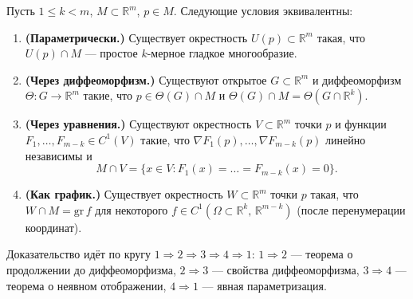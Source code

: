 \begin{theorem}
  \label{theorem:manifold}
  Пусть $1 \leq k < m$, $M \subset \mathbb{R}^m$, $p \in M$.
  Следующие условия эквивалентны:

  \begin{enumerate}
    \item \textbf{(Параметрически.)}
          Существует окрестность $U(p) \subset \mathbb{R}^m$ такая, что
          $U(p) \cap M$ --- простое $k$-мерное гладкое многообразие.

    \item \textbf{(Через диффеоморфизм.)}
          Существуют открытое $G \subset \mathbb{R}^m$ и диффеоморфизм
          $\Theta: G \to \mathbb{R}^m$ такие, что $p \in \Theta(G) \cap M$
          и $\Theta(G) \cap M = \Theta(G \cap \mathbb{R}^k)$.

    \item \textbf{(Через уравнения.)}
          Существуют окрестность $V \subset \mathbb{R}^m$ точки $p$ и
          функции $F_1, \ldots, F_{m-k} \in C^1(V)$ такие, что
          $\nabla F_1(p), \ldots, \nabla F_{m-k}(p)$ линейно независимы
          и
          \[
            M \cap V = \{x \in V : F_1(x) = \ldots = F_{m-k}(x) = 0\}.
          \]

    \item \textbf{(Как график.)}
          Существует окрестность $W \subset \mathbb{R}^m$ точки $p$ такая,
          что $W \cap M = \mathrm{gr}\,f$ для некоторого
          $f \in C^1(\Omega \subset \mathbb{R}^k,\, \mathbb{R}^{m-k})$
          (после перенумерации координат).
  \end{enumerate}
\end{theorem}

\begin{note}
  Доказательство идёт по кругу $1 \Rightarrow 2 \Rightarrow 3
  \Rightarrow 4 \Rightarrow 1$:
  $1\Rightarrow 2$ --- теорема о продолжении до диффеоморфизма,
  $2\Rightarrow 3$ --- свойства диффеоморфизма,
  $3\Rightarrow 4$ --- теорема о неявном отображении,
  $4\Rightarrow 1$ --- явная параметризация.
\end{note}

